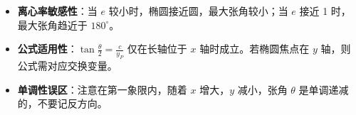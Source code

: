 \begin{trapbox}
\begin{itemize}
    \item \textbf{离心率敏感性}：当 $e$ 较小时，椭圆接近圆，最大张角较小；当 $e$ 接近 1 时，最大张角趋近于 $180^\circ$。
    \item \textbf{公式适用性}：$\tan \frac{\theta}{2} = \frac{c}{y_P}$ 仅在长轴位于 $x$ 轴时成立。若椭圆焦点在 $y$ 轴，则公式需对应交换变量。
    \item \textbf{单调性误区}：注意在第一象限内，随着 $x$ 增大，$y$ 减小，张角 $\theta$ 是单调递减的，不要记反方向。
\end{itemize}
\end{trapbox}